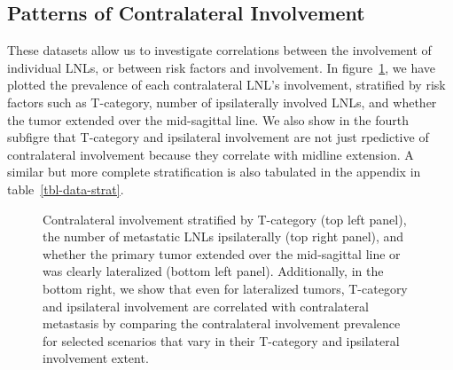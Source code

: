 \documentclass[
  sn-mathphys-num,
]{sn-jnl}
\begin{document}
\subsection{Patterns of Contralateral Involvement}\label{sec-data-strat}

These datasets allow us to investigate correlations between the
involvement of individual LNLs, or between risk factors and involvement.
In figure~\ref{fig-data-strat}, we have plotted the prevalence of each
contralateral LNL's involvement, stratified by risk factors such as
T-category, number of ipsilaterally involved LNLs, and whether the tumor
extended over the mid-sagittal line. We also show in the fourth subfigre
that T-category and ipsilateral involvement are not just rpedictive of
contralateral involvement because they correlate with midline extension.
A similar but more complete stratification is also tabulated in the
appendix in table~\ref{tbl-data-strat}.

\begin{figure}


\caption{\label{fig-data-strat}Contralateral involvement stratified by
T-category (top left panel), the number of metastatic LNLs ipsilaterally
(top right panel), and whether the primary tumor extended over the
mid-sagittal line or was clearly lateralized (bottom left panel).
Additionally, in the bottom right, we show that even for lateralized
tumors, T-category and ipsilateral involvement are correlated with
contralateral metastasis by comparing the contralateral involvement
prevalence for selected scenarios that vary in their T-category and
ipsilateral involvement extent.}

\end{figure}%
\end{document}
